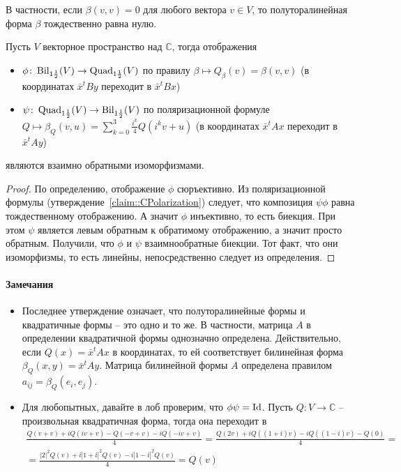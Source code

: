 В частности, если $\beta(v, v) = 0$ для любого вектора $v\in V$, то полуторалинейная форма $\beta$ тождественно равна нулю.

\begin{claim}
\label{claim::CBilQuad}
Пусть $V$ векторное пространство над $\mathbb C$, тогда отображения
\begin{itemize}
\item $\phi\colon\operatorname{Bil}_{1\frac{1}{2}}(V)\to \operatorname{Quad}_{1\frac{1}{2}}(V)$ по правилу $\beta\mapsto Q_\beta(v) = \beta(v,v)$ (в координатах $\bar x^t B y$ переходит в $\bar x^t B x$)

\item $\psi\colon\operatorname{Quad}_{1\frac{1}{2}}(V)\to \operatorname{Bil}_{1\frac{1}{2}}(V)$ по поляризационной формуле $Q\mapsto \beta_Q(v,u) = \sum_{k=0}^3 \frac{i^k}{4}Q(i^k v + u)$ (в координатах $\bar x^t A x$ переходит в $\bar x^t A y$)
\end{itemize}
являются взаимно обратными изоморфизмами.
\end{claim}
\begin{proof}
По определению, отображение $\phi$ сюръективно.
Из поляризационной формулы (утверждение~\ref{claim::CPolarization}) следует, что композиция $\psi\phi$ равна тождественному отображению.
А значит $\phi$ инъективно, то есть биекция.
При этом $\psi$ является левым обратным к обратимому отображению, а значит просто обратным.
Получили, что $\phi$ и $\psi$ взаимнообратные биекции.
Тот факт, что они изоморфизмы, то есть линейны, непосредственно следует из определения.
\end{proof}

\paragraph{Замечания}

\begin{itemize}
\item Последнее утверждение означает, что полуторалинейные формы и квадратичные формы -- это одно и то же.
В частности, матрица $A$ в определении квадратичной формы однозначно определена.
Действительно, если $Q(x) = \bar x^t A x$ в координатах, то ей соответствует билинейная форма $\beta_Q(x, y) = \bar x^t A y$.
Матрица билинейной формы $A$ определена правилом $a_{ij} = \beta_Q(e_i, e_j)$.

\item Для любопытных, давайте в лоб проверим, что $\phi\psi = \operatorname{Id}$.
Пусть $Q\colon V\to \mathbb C$ -- произвольная квадратичная форма, тогда она переходит в
\begin{gather*}
\frac{Q(v+v) + iQ(iv+v) - Q(-v+v) -i Q(-iv + v)}{4} = \frac{Q(2v) + iQ((1+i)v) - i Q((1-i)v) - Q(0)}{4} =\\ =\frac{|2|^2 Q(v)+i|1+i|^2Q(v) - i|1-i|^2Q(v)}{4} = Q(v)
\end{gather*}
\end{itemize}
